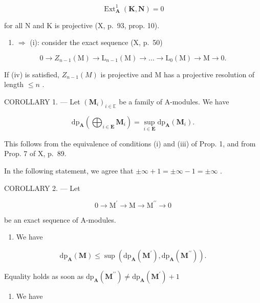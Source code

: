 \[
\operatorname{Ext} _ {\mathbf {A}} ^ {1} (\mathbf {K}, \mathbf {N}) = 0
\]

for all N and K is projective (X, p.~93, prop. 10).

\begin{enumerate}
\def\labelenumi{(\roman{enumi})}
\setcounter{enumi}{3}
\tightlist
\item
  \(\Rightarrow\) (i): consider the exact sequence (X, p.~50)
\end{enumerate}

\[
0 \to Z _ {n - 1} (\mathrm{M}) \to \mathrm{L} _ {n - 1} (\mathrm{M}) \to \dots \to \mathrm{L} _ {0} (\mathrm{M}) \to \mathrm{M} \to 0.
\]

If (iv) is satisfied, \(Z_{n-1}(M)\) is projective and M has a projective resolution of length \(\leqslant n\) .

COROLLARY 1. --- Let \((\mathbf{M}_i)_{i\in \mathbb{E}}\) be a family of A-modules. We have

\[
\mathrm{dp} _ {\mathbf {A}} \left(\bigoplus_ {i \in \mathbf {E}} \mathbf {M} _ {i}\right) = \sup _ {i \in \mathbf {E}} \mathrm{dp} _ {\mathbf {A}} (\mathbf {M} _ {i}).
\]

This follows from the equivalence of conditions (i) and (iii) of Prop. 1, and from Prop. 7 of X, p.~89.

In the following statement, we agree that \(\pm\infty + 1 = \pm\infty - 1 = \pm\infty\) .

COROLLARY 2. --- Let

\[
0 \rightarrow \mathrm{M} ^ {\prime} \rightarrow \mathrm{M} \rightarrow \mathrm{M} ^ {\prime \prime} \rightarrow 0
\]

be an exact sequence of A-modules.

\begin{enumerate}
\def\labelenumi{\alph{enumi})}
\tightlist
\item
  We have
\end{enumerate}

\[
\mathrm{dp} _ {\mathbf {A}} (\mathbf {M}) \leqslant \sup \left(\mathrm{dp} _ {\mathbf {A}} (\mathbf {M} ^ {\prime}), \mathrm{dp} _ {\mathbf {A}} (\mathbf {M} ^ {\prime \prime})\right).
\]

Equality holds as soon as \(\mathrm{dp}_{\mathbf{A}}(\mathbf{M}^{\prime \prime})\neq \mathrm{dp}_{\mathbf{A}}(\mathbf{M}^{\prime}) + 1\)

\begin{enumerate}
\def\labelenumi{\alph{enumi})}
\setcounter{enumi}{1}
\tightlist
\item
  We have
\end{enumerate}

